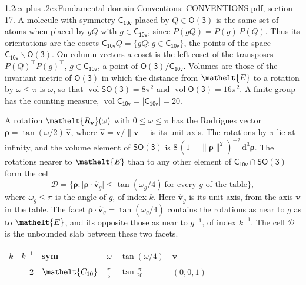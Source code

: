 \documentclass[10pt,a4paper]{article}
\makeatletter
\renewcommand\section{\@startsection{section}{1}{\z@}{-3ex plus -1ex minus -.2ex}%
  {1.2ex plus .2ex}{\normalfont\large\sffamily\bfseries\color{parttitle}}}
\numberwithin{equation}{section}
\newcommand{\eltfont}[1]{{\let\sigma\eltsigma\mathelt{#1}}}
\newcommand{\grp}[1]{\mathsf{#1}}
\newcommand{\cls}[1]{\eltfont{#1}}
\newcommand{\elt}[1]{\eltfont{#1}}
\newcommand{\dirvec}[3]{(#1, #2, #3)}
\newcommand{\unitaxis}{\hat{\mathbf{v}}}
\newcommand{\vv}{\mathbf{v}}
\newcommand{\diff}{\mathrm{d}}
\newcommand{\vol}{\operatorname{vol}}
\newcommand{\rodrigues}{\boldsymbol{\rho}}
\newcommand{\fcell}{\mathcal{D}}
\makeatother
\begin{document}
\section{Fundamental domain}\label{s:fundamental_domain}
Conventions: \href{../../CONVENTIONS.pdf}{CONVENTIONS.pdf}, section \href{../../CONVENTIONS.pdf\#conv.17}{17}.
\leavevmode\label{n:element.placement}A molecule with symmetry $\grp{C_{10v}}$ placed by $Q \in \grp{O(3)}$ is the same set of atoms when placed by $gQ$ with $g \in \grp{C_{10v}}$, since $P(gQ) = P(g)\,P(Q)$. \label{n:operator.cosets}Thus its orientations are the cosets $\grp{C_{10v}}Q = \{gQ : g \in \grp{C_{10v}}\}$, the points of the space $\grp{C_{10v}}\backslash\grp{O(3)}$. On column vectors a coset is the left coset of the transposes $P(Q)^{\top}P(g)^{\top}$, $g \in \grp{C_{10v}}$, a point of $\grp{O(3)}/\grp{C_{10v}}$.
\leavevmode\label{n:operator.volume}Volumes are those of the invariant metric of \href{O3.pdf}{$\grp{O(3)}$} in which the distance from $\elt{E}$ to a rotation by $\omega \le \pi$ is $\omega$, so that $\vol\grp{SO(3)} = 8\pi^2$ and $\vol\grp{O(3)} = 16\pi^2$. A finite group has the counting measure, $\vol\grp{C_{10v}} = |\grp{C_{10v}}| = 20$.

\leavevmode\label{n:vector.rodrigues}\label{n:vector.unitaxis}A rotation $\elt{R_{\vv}}(\omega)$ with $0 \le \omega \le \pi$ has the Rodrigues vector $\rodrigues = \tan(\omega/2)\,\unitaxis$, where $\unitaxis = \vv/\lVert\vv\rVert$ is its unit axis. The rotations by $\pi$ lie at infinity, and the volume element of \href{SO3.pdf}{$\grp{SO(3)}$} is $8\,(1 + \lVert\rodrigues\rVert^2)^{-2}\,\diff^3\rodrigues$.
\leavevmode\label{n:set.cell}The rotations nearer to $\elt{E}$ than to any other element of $\grp{C_{10v}} \cap \grp{SO(3)}$ form the cell
\begin{equation}\label{e:cell}\fcell = \bigl\{\rodrigues : \lvert\rodrigues\cdot\unitaxis_g\rvert \le \tan(\omega_g/4)\ \text{for every $g$ of the table}\bigr\},\end{equation}
where $\omega_g \le \pi$ is the angle of $g$, of index $k$. Here $\unitaxis_g$ is its unit axis, from the axis $\vv$ in the table. The facet $\rodrigues\cdot\unitaxis_g = \tan(\omega_g/4)$ contains the rotations as near to $g$ as to $\elt{E}$, and its opposite those as near to $g^{-1}$, of index $k^{-1}$. The cell $\fcell$ is the unbounded slab between these two facets.
{\small{\renewcommand{\arraystretch}{1.3}\begin{longtable}{@{}rrllll@{}}\toprule
$k$ & $k^{-1}$ & sym & $\omega$ & $\tan(\omega/4)$ & $\vv$\\\midrule\endhead
\bottomrule\endfoot\endlastfoot
1 & 2 & $\cls{C_{10}}$ & $\tfrac{\pi}{5}$ & $\tan\tfrac{\pi}{20}$ & $\dirvec{0}{0}{1}$\\
\bottomrule\end{longtable}}}
\end{document}
